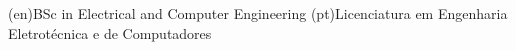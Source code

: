 %
%
%



%
%
%



%
%
%
\ntauthordegree(en){BSc in Electrical and Computer Engineering}
\ntauthordegree(pt){Licenciatura em Engenharia Eletrotécnica e de Computadores}



